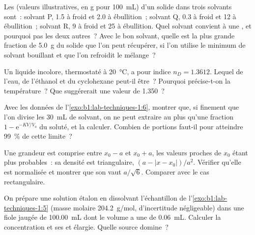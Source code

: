 \begin{exercise}[$\star\star$]\label{exo:b1:lab-techniques-1:8}
Les  (valeurs illustratives, en \unit{g} pour \qty{100}{mL})
d'un solide dans trois solvants sont~: solvant P, 1.5 à froid et 2.0 à
ébullition~; solvant Q, 0.3 à froid et 12 à ébullition~; solvant R, 9 à
froid et 25 à ébullition. Quel solvant convient à une ,
et pourquoi pas les deux autres~? Avec le bon solvant, quelle est la plus
grande fraction de \qty{5.0}{g} du solide que l'on peut récupérer, si
l'on utilise le minimum de solvant bouillant et que l'on refroidit le
mélange~?
\end{exercise}

\begin{exercise}[$\star\star$]\label{exo:b1:lab-techniques-1:9}
Un liquide incolore, thermostaté à \qty{20}{\celsius}, a pour indice
$n_D = 1.3612$. Lequel de l'eau, de l'éthanol et du cyclohexane peut-il
être~? Pourquoi précise-t-on la température~? Que suggérerait une valeur
de 1.350~?
\end{exercise}

\begin{exercise}[$\star\star\star$]\label{exo:b1:lab-techniques-1:10}
Avec les données de l'\cref{exo:b1:lab-techniques-1:6}, montrer que, si
finement que l'on divise les \qty{30}{mL} de solvant, on ne peut
extraire au plus qu'une fraction
$1 - \mathrm{e}^{-KV/V_a}$ du soluté, et la calculer.
Combien de portions faut-il pour atteindre \qty{99}{\percent} de cette
limite~?
\end{exercise}

\begin{exercise}[$\star\star\star$]\label{exo:b1:lab-techniques-1:11}
Une grandeur est comprise entre $x_0 - a$ et $x_0 + a$, les valeurs
proches de
$x_0$ étant plus probables~: sa densité est triangulaire,
$(a - |x - x_0|)/a^2$. Vérifier qu'elle est normalisée et montrer que
son  vaut
$a/\sqrt6$. Comparer avec le cas rectangulaire.
\end{exercise}

\begin{exercise}[$\star\star\star$]\label{exo:b1:lab-techniques-1:12}
On prépare une solution étalon en dissolvant l'échantillon de
l'\cref{exo:b1:lab-techniques-1:5} (masse molaire \qty{204.2}{g/mol},
d'incertitude négligeable) dans une fiole jaugée de \qty{100.00}{mL}
dont le volume a une  de \qty{0.06}{mL}. Calculer la
concentration et ses  et élargie. Quelle source
domine~?
\end{exercise}

